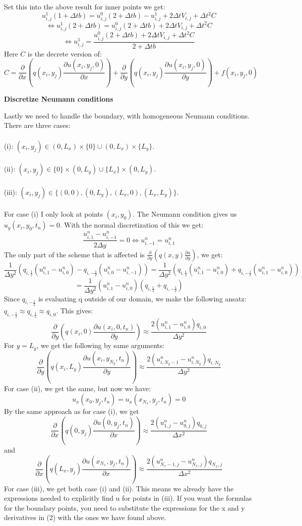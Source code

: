 \documentclass[11pt,a4paper]{report}
\begin{document}
Set this into the above result for inner points we get: $$u_{i,j}^{1}(1+\Delta t b)=u_{i,j}^0(2+\Delta t b)-u_{i,j}^{1}+2\Delta t V_{i,j}+\Delta t^2 C $$ $$\iff u_{i,j}^{1}(2+\Delta t b)=u_{i,j}^0(2+\Delta t b)+2\Delta t V_{i,j}+\Delta t^2 C $$ $$\iff u_{i,j}^{1} = \frac{u_{i,j}^0(2+\Delta t b)+2\Delta t V_{i,j}+\Delta t^2 C}{2+\Delta t b} $$
Here $C$ is the decrete version of: $$C=\frac{\partial }{\partial x}(q(x_i,y_j)\frac{\partial u(x_i,y_j,0)}{\partial x}) +\frac{\partial }{\partial y}(q(x_i,y_j)\frac{\partial u(x_i,y_j,0)}{\partial y})+f(x_i,y_j,0)$$
\begin{center}
\Large \textbf{Discretize Neumann conditions}
\Large


\end{center}
Lastly we need to handle the boundary, with homogeneous Neumann conditions. There are three cases:
\\
\\
(i): $(x_i,y_j) \in (0,L_x)\times \{ 0\} \cup (0,L_x)\times \{ L_y\} $.
\\
\\
(ii): $(x_i,y_j) \in \{ 0\}\times(0,L_y)  \cup  \{ L_x\} \times (0,L_y)$.
\\
\\
(iii): $(x_i,y_j) \in \{(0,0),(0,L_y),(L_x,0),(L_x,L_y)  \}$.
\\
\\
For case (i) I only look at points $(x_i,y_0)$. The Neumann condition gives us $u_y(x_i,y_0,t_n)=0$. With the normal discretization of this we get: $$ \frac{u_{i,1}^n-u_{i,-1}^n}{2\Delta y}= 0 \iff u_{i,-1}^n = u_{i,1}^n $$ The only part of the scheme that is affected is $ \frac{\partial }{\partial y}(q(x,y)\frac{\partial u}{\partial y}) $, we get: $$ \frac{1}{\Delta y^2}(q_{i,\frac{1}{2}}(u_{i,1}^{n}-u_{i,0}^{n})-q_{i,-\frac{1}{2}}(u_{i,0}^{n}-u_{i,-1}^{n})) =\frac{1}{\Delta y^2}(q_{i,\frac{1}{2}}(u_{i,1}^{n}-u_{i,0}^{n})+q_{i,-\frac{1}{2}}(u_{i,1}^{n}-u_{i,0}^{n})) $$ $$=\frac{1}{\Delta y^2}(u_{i,1}^{n}-u_{i,0}^{n})(q_{i,\frac{1}{2}}+q_{i,-\frac{1}{2}}) $$ Since $q_{i,-\frac{1}{2}} $ is evaluating q outside of our domain, we make the following ansatz: $q_{i,-\frac{1}{2}} \approx q_{i,\frac{1}{2}} \approx q_{i,0}$. This gives: $$\frac{\partial }{\partial y}(q(x_i,0)\frac{\partial u(x_i,0,t_n)}{\partial y}) \approx \frac{2(u_{i,1}^{n}-u_{i,0}^{n})q_{i,0}}{\Delta y^2} $$ For $y=L_y$, we get the following by same arguments: $$\frac{\partial }{\partial y}(q(x_i,L_y)\frac{\partial u(x_i,y_{N_y},t_n)}{\partial y}) \approx \frac{2(u_{i,N_y-1}^{n}-u_{i,N_y}^{n})q_{i,N_y}}{\Delta y^2} $$ For case (ii), we get the same, but now we have: $$u_x(x_0,y_j,t_n)=u_x(x_{N_x},y_j,t_n)=0$$ By the same approach as for case (i), we get $$\frac{\partial }{\partial x}(q(0,y_j)\frac{\partial u(0,y_j,t_n)}{\partial x}) \approx \frac{2(u_{1,j}^{n}-u_{0,j}^{n})q_{0,j}}{\Delta x^2} $$ and $$\frac{\partial }{\partial x}(q(L_x,y_j)\frac{\partial u(x_{N_x},y_j,t_n)}{\partial x}) \approx \frac{2(u_{N_x-1,j}^{n}-u_{N_x,j}^{n})q_{N_x,j}}{\Delta x^2} $$ For case (iii), we get both case (i) and (ii). This means we already have the expressions needed to  explicitly find u for points in (iii). If you want the formulas for the boundary points, you need to substitute the expressions for the x and y derivatives in (2) with the ones we have found above.
\end{document}
